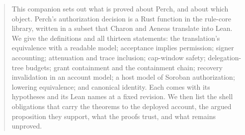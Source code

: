 \begin{abstract}
This companion sets out what is proved about Perch, and about which object.
Perch's authorization decision is a Rust function in the rule-core library,
written in a subset that Charon and Aeneas translate into Lean. We give the
definitions and all thirteen statements: the translation's equivalence with a
readable model; acceptance implies permission; signer accounting; attenuation
and trace inclusion; cap-window safety; delegation-tree budgets; grant
containment and the containment chain; recovery invalidation in an account
model; a host model of Soroban authorization; lowering equivalence; and
canonical identity. Each comes with its hypotheses and its Lean names at a fixed
revision. We then list the shell obligations that carry the theorems to the
deployed account, the argued proposition they support, what the proofs trust,
and what remains unproved.
\end{abstract}
